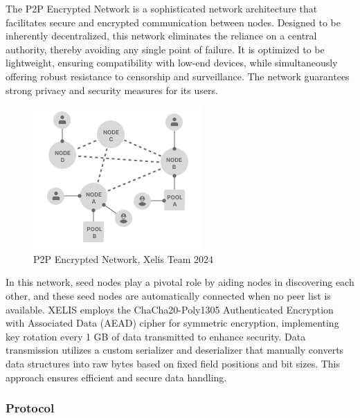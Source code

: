\documentclass[10pt,a4paper,twocolumn]{article}
\begin{document}
The P2P Encrypted Network is a sophisticated network architecture that facilitates secure and encrypted communication between nodes. Designed to be inherently decentralized, this network eliminates the reliance on a central authority, thereby avoiding any single point of failure. It is optimized to be lightweight, ensuring compatibility with low-end devices, while simultaneously offering robust resistance to censorship and surveillance. The network guarantees strong privacy and security measures for its users.\\

\begin{figure}
    \centering
    \includegraphics[width=0.8\linewidth]{P2P.png}
    \caption{P2P Encrypted Network, Xelis Team 2024}
    \label{fig:enter-label}
\end{figure}

In this network, seed nodes play a pivotal role by aiding nodes in discovering each other, and these seed nodes are automatically connected when no peer list is available. XELIS employs the ChaCha20-Poly1305 Authenticated Encryption with Associated Data (AEAD) cipher for symmetric encryption, implementing key rotation every 1 GB of data transmitted to enhance security. Data transmission utilizes a custom serializer and deserializer that manually converts data structures into raw bytes based on fixed field positions and bit sizes. This approach ensures efficient and secure data handling.

\subsubsection{Protocol}
\end{document}
